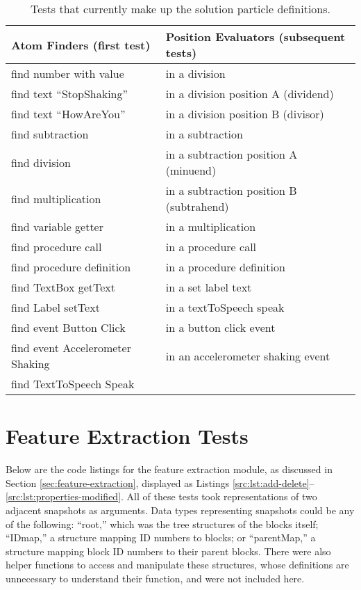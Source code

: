 \begin{table}
\begin{centering}
    \begin{tabular}{l l}
        Atom Finders (first test)           & Position Evaluators (subsequent tests) \\ \hline
        find number with value              & in a division \\
        find text ``StopShaking''           & in a division position A  (dividend)  \\
        find text ``HowAreYou''             & in a division position B  (divisor)   \\
        find subtraction                    & in a subtraction  \\
        find division                       & in a subtraction position A (minuend) \\
        find multiplication                 & in a subtraction position B (subtrahend)  \\
        find variable getter                & in a multiplication   \\
        find procedure call                 & in a procedure call   \\
        find procedure definition           & in a procedure definition \\
        find TextBox getText                & in a set label text   \\
        find Label setText                  & in a textToSpeech speak   \\
        find event Button Click             & in a button click event   \\
        find event Accelerometer Shaking    & in an accelerometer shaking event     \\
        find TextToSpeech Speak             &   \\

    \end{tabular}
    \caption[Particle solution tests]{Tests that currently make up the solution particle definitions.}
    \label{tab:particle-tests}
\end{centering}
\end{table}


\section{Feature Extraction Tests}
\label{src:feature-extraction-tests}

Below are the code listings for the feature extraction module, as discussed in Section \ref{sec:feature-extraction}, displayed as Listings \ref{src:lst:add-delete}--\ref{src:lst:properties-modified}. All of these tests took representations of two adjacent snapshots as arguments. Data types representing snapshots could be any of the following: ``root,'' which was the tree structures of the blocks itself; ``IDmap,'' a structure mapping ID numbers to blocks; or ``parentMap,'' a structure mapping block ID numbers to their parent blocks. There were also helper functions to access and manipulate these structures, whose definitions are unnecessary to understand their function, and were not included here.

